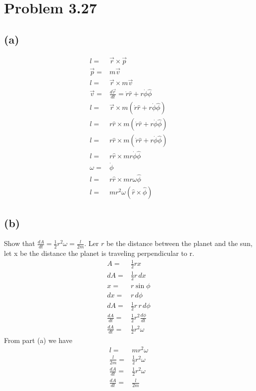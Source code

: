 \documentclass[12pt, a4paper]{article}
\begin{document}
\pagebreak
\section*{Problem 3.27}
\subsection*{(a)}
\begin{align*}
l =& \vec{r} \times \vec{p}
\\
\vec{p} =& m\vec{v}
\\
l =& \vec{r} \times m\vec{v}
\\
\vec{v} =& \frac{d\vec{r}}{dt} = \dot{r}\hat{r} + r\dot{\phi}\hat{\phi}
\\
l =& \vec{r} \times m(\dot{r}\hat{r} + r\dot{\phi}\hat{\phi})
\\
l =& r\hat{r} \times m(\dot{r}\hat{r} + r\dot{\phi}\hat{\phi})
\\
l =& r\hat{r} \times m(\dot{r}\hat{r} + r\dot{\phi}\hat{\phi})
\\
l =& r\hat{r} \times m r\dot{\phi}\hat{\phi}
\\
\omega =& \dot{\phi}
\\
l =& r\hat{r} \times m r\omega\hat{\phi}
\\
l =&  \boxed{ m r^2\omega(\hat{r}\times\hat{\phi}) }
\end{align*}
\subsection*{(b)}
Show that $\frac{dA}{dt} = \tfrac{1}{2}r^2\omega = \frac{l}{2m}$. 
Ler $r$ be the distance between the planet and the sun, let x be the 
distance the planet is traveling perpendicular to r. 
\begin{align*}
A =& \frac{1}{2} r  x
\\
dA =& \frac{1}{2} r \, dx
\\
x =& r\sin\phi
\\
dx =& r\, d\phi
\\
dA =& \frac{1}{2} r \,  r\, d\phi
\\
\frac{dA}{dt} =& \frac{1}{2} r^2 \frac{d\phi}{dt}
\\
\frac{dA}{dt} =& \boxed{\frac{1}{2} r^2 \omega}
\end{align*}
From part (a) we have 
\begin{align}
l =&  m r^2\omega
\\
\frac{l}{2m} =&  \frac{1}{2} r^2\omega
\\
\frac{dA}{dt} =& \frac{1}{2} r^2 \omega
\\
\frac{dA}{dt} =&\boxed{\frac{l}{2m}}
\end{align}
\end{document}
